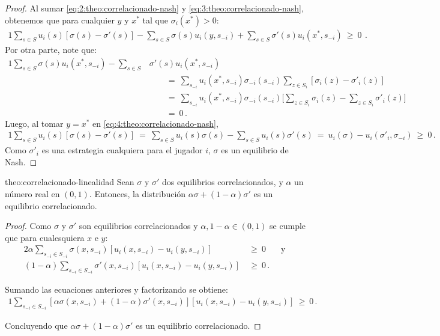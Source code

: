 \begin{proof}
Al sumar \eqref{eq:2:theo:correlacionado-nash} y
\eqref{eq:3:theo:correlacionado-nash}, obtenemos que para cualquier $y$ y $x^*$ tal que $\sigma_i(x^*)>0$:
\begin{alignat}{1}
\label{eq:4:theo:correlacionado-nash}
\sum_{s \in S} u_i(s) [\sigma(s) - \sigma'(s)] - \sum_{s \in S} \sigma(s)u_i(y, s_{-i}) + \sum_{s \in S} \sigma'(s) u_i(x^*, s_{-i})\ \geq\ 0\ \,.
\end{alignat}
Por otra parte, note que:
\begin{alignat}{1}
  \sum_{s \in S} \sigma(s) u_i(x^*,s_{-i}) - \sum_{s \in S} &\sigma'(s) u_i(x^*,s_{-i}) \\
    &\qquad=\ \sum_{s_{-i}} u_i(x^*,s_{-i}) \sigma_{-i}(s_{-i}) \sum_{z\in S_i} [\sigma_i(z) - \sigma'_i(z)] \\
    &\qquad=\ \sum_{s_{-i}} u_i(x^*,s_{-i}) \sigma_{-i}(s_{-i}) \biggl[ \sum_{z\in S_i} \sigma_i(z) - \sum_{z\in S_i} \sigma'_i(z) \biggr] \\
    &\qquad=\ 0 \,.
\end{alignat}
Luego, al tomar $y=x^*$ en \eqref{eq:4:theo:correlacionado-nash},
\begin{alignat}{1}
 \sum_{s \in S} u_i(s) [\sigma(s) - \sigma'(s)]\ =\ \sum_{s \in S} u_i(s)\sigma(s) - \sum_{s \in S} u_i(s)\sigma'(s)\ =\ u_i(\sigma) - u_i(\sigma'_i, \sigma_{-i})\ \geq\ 0 \,.
\end{alignat}
Como $\sigma'_i$ es una estrategia cualquiera para el jugador $i$, $\sigma$ es un equilibrio de Nash.
\end{proof}

\begin{reptheorem}{theo:correlacionado-linealidad}
Sean $\sigma$ y $\sigma'$ dos equilibrios correlacionados, y $\alpha$ un número real en $(0,1)$. Entonces, la distribución $\alpha\sigma + (1-\alpha)\sigma'$ es un equilibrio correlacionado.
\end{reptheorem}

\begin{proof}
Como $\sigma$ y $\sigma'$ son equilibrios correlacionados y $\alpha, 1 - \alpha \in (0, 1)$ se cumple que para cualesquiera $x$ e $y$:
\begin{alignat}{2}
 \alpha \sum_{s_{-i} \in S_{-i}} \sigma(x, s_{-i})[u_i(x, s_{-i}) - u_i(y, s_{-i})]\ & \geq\ 0 & \ \text{ y } \\
 (1 - \alpha) \sum_{s_{-i} \in S_{-i}} \sigma'(x, s_{-i})[u_i(x, s_{-i}) - u_i(y, s_{-i})]\ & \geq\ 0 \,.
\end{alignat}

Sumando las ecuaciones anteriores y factorizando se obtiene:
\begin{alignat}{1}
 \sum _{s_{-i} \in S_{-i}} [ \alpha \sigma(x, s_{-i}) +  (1 - \alpha) \sigma'(x, s_{-i})][u_i(x, s_{-i}) - u_i(y, s_{-i})]\ \geq\ 0 \,.
\end{alignat}

Concluyendo que $\alpha \sigma +  (1 - \alpha) \sigma'$ es un equilibrio correlacionado.
\end{proof}

